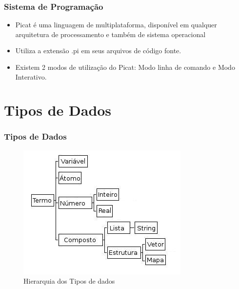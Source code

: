 \documentclass[10pt]{beamer}
\begin{document}



\begin{frame}
    \frametitle{Sistema de Programação}
    \begin{itemize}
     \item Picat é uma linguagem de multiplataforma, disponível em qualquer arquitetura de processamento e também de sistema operacional
     \item Utiliza a extensão .pi em seus arquivos de código fonte. 
     \item Existem 2 modos de utilização do Picat: Modo linha de comando e Modo Interativo. 
    \end{itemize}
\end{frame}




\section{Tipos de Dados}

\begin{frame}
\frametitle{Tipos de Dados}
\begin{figure}[!ht]
\centering
\includegraphics[width=.6\textwidth]{figures/tipos_dados_picat_traduzido.jpg}
\caption{Hierarquia dos Tipos de dados}
\label{Hiera}
\end{figure}
\end{frame}


\end{document}
